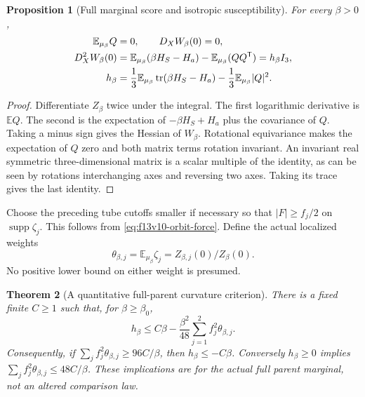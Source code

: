 \documentclass[11pt,oneside]{article}
\newtheorem{theorem}{Theorem}[section]
\newtheorem{proposition}[theorem]{Proposition}
\begin{document}
\begin{proposition}[Full marginal score and isotropic susceptibility]
\label{prop:f13v10-score}
For every \(\beta>0\),
\begin{align}
 \mathbb E_{\mu_\beta}Q&=0,\qquad D_XW_\beta(0)=0,\notag\\
 D_X^2W_\beta(0)
   &=\mathbb E_{\mu_\beta}(\beta H_S-H_a)
                         -\mathbb E_{\mu_\beta}(QQ^{\mathsf T})
     =h_\beta I_3,\label{eq:f13v10-score}\\
 h_\beta
   &=\frac13\mathbb E_{\mu_\beta}
                   \operatorname{tr}(\beta H_S-H_a)
                     -\frac13\mathbb E_{\mu_\beta}|Q|^2.\notag
\end{align}
\end{proposition}

\begin{proof}
Differentiate \(Z_\beta\) twice under the integral.
The first logarithmic derivative is \(\mathbb E Q\).
The second is the expectation of
\(-\beta H_S+H_a\) plus the covariance of \(Q\).
Taking a minus sign gives the Hessian of \(W_\beta\).
Rotational equivariance makes the expectation of \(Q\)
zero and both matrix terms rotation invariant.
An invariant real symmetric three-dimensional matrix
is a scalar multiple of the identity, as can be seen
by rotations interchanging axes and reversing two axes.
Taking its trace gives the last identity.
\end{proof}

Choose the preceding tube cutoffs smaller if necessary
so that \(|F|\ge f_j/2\) on \(\operatorname{supp}\zeta_j\).
This follows from \eqref{eq:f13v10-orbit-force}.
Define the actual localized weights
\[
 \theta_{\beta,j}=\mathbb E_{\mu_\beta}\zeta_j
                   =Z_{\beta,j}(0)/Z_\beta(0).
\]
No positive lower bound on either weight is presumed.

\begin{theorem}[A quantitative full-parent curvature criterion]
\label{thm:f13v10-weight}
There is a fixed finite \(C\ge1\) such that, for
\(\beta\ge\beta_0\),
\begin{equation}\label{eq:f13v10-weight}
 h_\beta\le C\beta
        -\frac{\beta^2}{48}
                 \sum_{j=1}^2 f_j^2\theta_{\beta,j}.
\end{equation}
Consequently, if
\(\sum_j f_j^2\theta_{\beta,j}\ge96C/\beta\),
then \(h_\beta\le-C\beta\).
Conversely \(h_\beta\ge0\) implies
\(\sum_j f_j^2\theta_{\beta,j}\le48C/\beta\).
These implications are for the actual full parent
marginal, not an altered comparison law.
\end{theorem}
\end{document}
